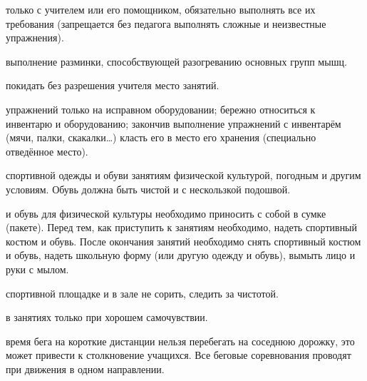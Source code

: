 \documentclass[bachelor, och, referat ]{SCWorks}
\begin{document}
\begin{itemize}
\begin{itemize}
 только с учителем или его помощником, обязательно выполнять все их требования (запрещается без педагога выполнять сложные и неизвестные упражнения).

 выполнение разминки, способствующей разогреванию основных групп мышц.

 покидать без разрешения учителя место занятий.

 упражнений только на исправном оборудовании; бережно относиться к инвентарю и оборудованию; закончив выполнение упражнений с инвентарём (мячи, палки, скакалки…) класть его в место его хранения (специально отведённое место).

 спортивной одежды и обуви занятиям физической культурой, погодным и другим условиям. Обувь должна быть чистой и с нескользкой подошвой.

 и обувь для физической культуры необходимо приносить с собой в сумке (пакете). Перед тем, как приступить к занятиям необходимо, надеть спортивный костюм и обувь. После окончания занятий необходимо снять спортивный костюм и обувь, надеть школьную форму (или другую одежду и обувь), вымыть лицо и руки с мылом.

 спортивной площадке и в зале не сорить, следить за чистотой.

 в занятиях только при хорошем самочувствии.

 время бега на короткие дистанции нельзя перебегать на соседнюю дорожку, это может привести к столкновение учащихся. Все беговые соревнования проводят при движения в одном направлении.
\end{itemize}
\end{itemize}

\newpage
\end{document}
